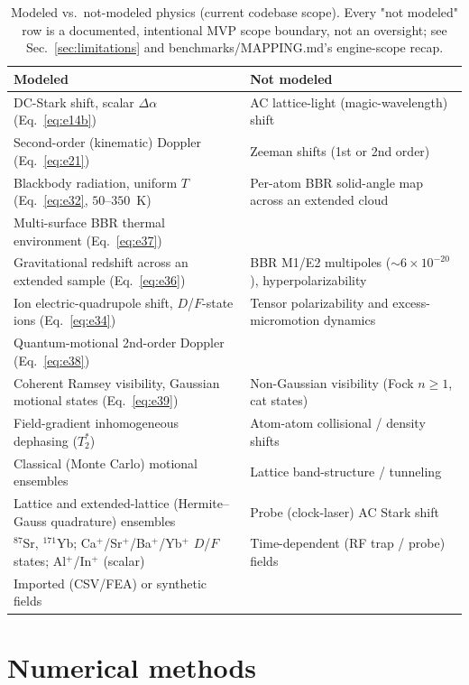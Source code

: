 \documentclass[aps,pra,superscriptaddress,groupedaddress,nofootinbib]{revtex4-2}
\begin{document}
\begin{table}[htbp]
\centering
\caption{Modeled vs.\ not-modeled physics (current codebase scope).
Every "not modeled" row is a documented, intentional MVP scope boundary,
not an oversight; see Sec.~\ref{sec:limitations} and
benchmarks/MAPPING.md's engine-scope recap.}
\label{tab:scope}
\begin{tabular}{ll}
\toprule
Modeled & Not modeled \\
\midrule
DC-Stark shift, scalar $\Delta\alpha$ (Eq.~\eqref{eq:e14b}) & AC lattice-light (magic-wavelength) shift \\
Second-order (kinematic) Doppler (Eq.~\eqref{eq:e21}) & Zeeman shifts (1st or 2nd order) \\
Blackbody radiation, uniform $T$ (Eq.~\eqref{eq:e32}, $50$--$350$~K) & Per-atom BBR solid-angle map across an extended cloud \\
Multi-surface BBR thermal environment (Eq.~\eqref{eq:e37}) & \\
Gravitational redshift across an extended sample (Eq.~\eqref{eq:e36}) & BBR M1/E2 multipoles ($\sim6\times10^{-20}$), hyperpolarizability \\
Ion electric-quadrupole shift, $D$/$F$-state ions (Eq.~\eqref{eq:e34}) & Tensor polarizability and excess-micromotion dynamics \\
Quantum-motional 2nd-order Doppler (Eq.~\eqref{eq:e38}) & \\
Coherent Ramsey visibility, Gaussian motional states (Eq.~\eqref{eq:e39}) & Non-Gaussian visibility (Fock $n\ge1$, cat states) \\
Field-gradient inhomogeneous dephasing ($T_2^*$) & Atom-atom collisional / density shifts \\
Classical (Monte Carlo) motional ensembles & Lattice band-structure / tunneling \\
Lattice and extended-lattice (Hermite--Gauss quadrature) ensembles & Probe (clock-laser) AC Stark shift \\
$^{87}$Sr, $^{171}$Yb; Ca$^+$/Sr$^+$/Ba$^+$/Yb$^+$ $D$/$F$ states; Al$^+$/In$^+$ (scalar) & Time-dependent (RF trap / probe) fields \\
Imported (CSV/FEA) or synthetic fields & \\
\bottomrule
\end{tabular}
\end{table}

\FloatBarrier
\section{Numerical methods}
\label{sec:methods}
\end{document}
